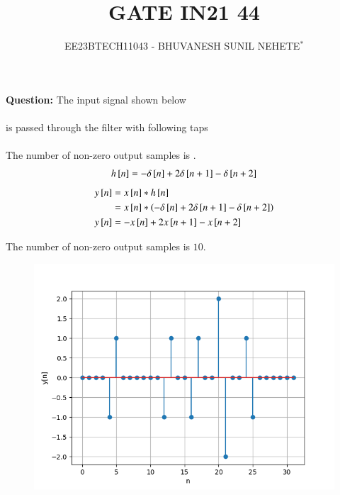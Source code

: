 \documentclass[journal,12pt,twocolumn]{IEEEtran}
\theoremstyle{remark}
\begin{document}

\vspace{3cm}

\title{GATE IN21 44}
\author{EE23BTECH11043 - BHUVANESH SUNIL NEHETE$^{*}$%
}
\maketitle
\newpage
\bigskip

\renewcommand{\thefigure}{\theenumi}
\renewcommand{\thetable}{\theenumi}



\textbf{Question:}
The input signal shown below \\
\\
is passed through the filter with following taps\\
\\
The number of non-zero output samples is \underline{\hspace{1cm}}.\\

\solution
\fi
\begin{align}
    h{}\left[n\right]=-\delta{}\left[n\right]+2\delta{}\left[n+1\right]-\delta{}\left[n+2\right]
\end{align}
\begin{align}
    y{}\left[n\right]&=x{}\left[n\right]*h{}\left[n\right]\\
    &=x{}\left[n\right]*\left(-\delta{}\left[n\right]+2\delta{}\left[n+1\right]-\delta{}\left[n+2\right]\right)\\
    y{}\left[n\right]&=-x{}\left[n\right]+2x{}\left[n+1\right]-x{}\left[n+2\right]
\end{align}


The number of non-zero output samples is $10$.

\begin{figure}
    \centering
    \includegraphics[width=1\linewidth]{2021/IN/44/figs/fig.png}
\end{figure}
\end{document}
